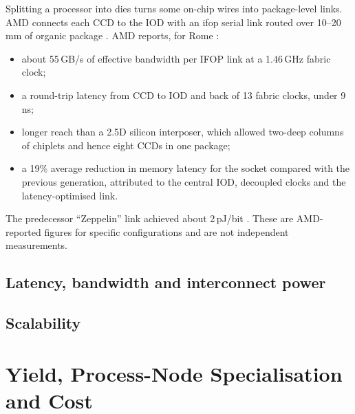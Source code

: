 Splitting a processor into dies turns some on-chip wires into package-level links. AMD connects each CCD to the IOD with an \gls{ifop} serial link routed over 10--20\,mm of organic package \cite{naffziger2020chiplet}. AMD reports, for Rome \cite{naffziger2020chiplet}:
\begin{itemize}
  \item about 55\,GB/s of effective bandwidth per IFOP link at a 1.46\,GHz fabric clock;
  \item a round-trip latency from CCD to IOD and back of 13 fabric clocks, under 9\,ns;
  \item longer reach than a 2.5D silicon interposer, which allowed two-deep columns of chiplets and hence eight CCDs in one package;
  \item a 19\% average reduction in memory latency for the socket compared with the previous generation, attributed to the central IOD, decoupled clocks and the latency-optimised link.
\end{itemize}
The predecessor ``Zeppelin'' link achieved about 2\,pJ/bit \cite{naffziger2020chiplet}. These are AMD-reported figures for specific configurations and are not independent measurements.

\subsection{Latency, bandwidth and interconnect power}

\subsection{Scalability}

\section{Yield, Process-Node Specialisation and Cost}
\label{sec:process-specialisation}

